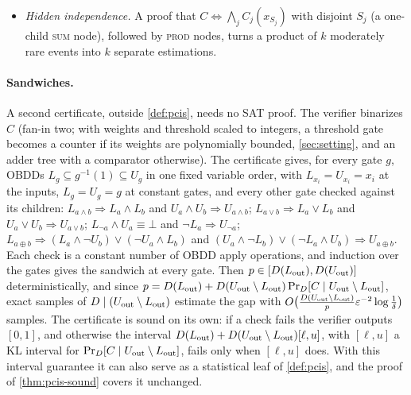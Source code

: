 \begin{itemize}
$\beta\ge1$ rational, whose constants have polynomial bit length. If
$C=[w\cdot x\ge\theta]\wedge H$, its looseness is
$K=K_{\rm tilt}/\Pr_D[H\mid w\cdot x\ge\theta]$, where
$K_{\rm tilt}=Z_\beta/D(w\cdot x\ge\theta)$ is the looseness on the threshold alone.
For unit weights with $\E_D[\sum_ix_i]\le\theta<|\{i:q_i>0\}|$, \cref{prop:tilting}
gives a rational $\beta$ (by bisection) with $K_{\rm tilt}\le\frac43(2\sqrt n+1)$. For
general integer weights no such bound holds: $K_{\rm tilt}$ can be $p^{-\Theta(1)}$
when one heavy coordinate carries the rarity (\cref{sec:tilting}), and the method
helps only when $K_{\rm tilt}$ happens to be small.
\item \emph{Hidden independence.} A proof that $C\Leftrightarrow\bigwedge_jC_j(x_{S_j})$
with disjoint $S_j$ (a one-child \textsc{sum} node), followed by \textsc{prod}
nodes, turns a product of $k$ moderately rare events into $k$ separate
estimations.
\end{itemize}

\paragraph{Sandwiches.}
A second certificate, outside \cref{def:pcis}, needs no SAT proof. The verifier
binarizes $C$ (fan-in
two; with weights and threshold scaled to integers, a threshold gate becomes a counter
if its weights are polynomially bounded, \cref{sec:setting}, and an adder tree with a
comparator otherwise). The certificate gives, for every gate $g$, OBDDs
$L_g\subseteq g^{-1}(1)\subseteq U_g$ in one fixed variable order, with
$L_{x_i}=U_{x_i}=x_i$ at the inputs, $L_g=U_g=g$ at constant gates, and every
other gate checked against its children: $L_{a\wedge b}\Rightarrow L_a\wedge L_b$ and
$U_a\wedge U_b\Rightarrow U_{a\wedge b}$; $L_{a\vee b}\Rightarrow L_a\vee L_b$ and $U_a\vee
U_b\Rightarrow U_{a\vee b}$; $L_{\neg a}\wedge U_a\equiv\bot$ and $\neg L_a\Rightarrow
U_{\neg a}$; $L_{a\oplus b}\Rightarrow(L_a\wedge\neg U_b)\vee(\neg U_a\wedge L_b)$ and
$(U_a\wedge\neg L_b)\vee(\neg L_a\wedge U_b)\Rightarrow U_{a\oplus b}$. Each check is a
constant number of OBDD apply operations, and induction over the gates gives the
sandwich at every gate. Then $p\in[D(L_{\rm out}),D(U_{\rm out})]$
deterministically, and since $p=D(L_{\rm out})+D(U_{\rm out}\setminus L_{\rm
out})\Pr_D[C\mid U_{\rm out}\setminus L_{\rm out}]$, exact samples of $D\mid(U_{\rm
out}\setminus L_{\rm out})$ estimate the gap with
$O\big(\frac{D(U_{\rm out}\setminus L_{\rm out})}{p}\varepsilon^{-2}\log\frac1\delta\big)$
samples. The certificate is sound on its own: if a check fails the verifier
outputs $[0,1]$, and otherwise the interval $D(L_{\rm out})+D(U_{\rm out}\setminus
L_{\rm out})[\ell,u]$, with $[\ell,u]$ a KL interval for $\Pr_D[C\mid U_{\rm
out}\setminus L_{\rm out}]$, fails only when $[\ell,u]$ does. With this interval
guarantee it can also serve as a statistical leaf of \cref{def:pcis}, and the proof of
\cref{thm:pcis-sound} covers it unchanged.
